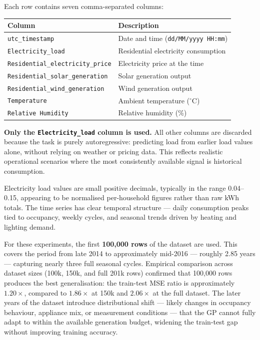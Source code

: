 \documentclass[12pt,a4paper]{article}
\begin{document}
Each row contains seven comma-separated columns:

\begin{center}
\begin{tabular}{ll}
\toprule
\textbf{Column} & \textbf{Description} \\
\midrule
\texttt{utc\_timestamp} & Date and time (\texttt{dd/MM/yyyy HH:mm}) \\
\texttt{Electricity\_load} & Residential electricity consumption \\
\texttt{Residential\_electricity\_price} & Electricity price at the time \\
\texttt{Residential\_solar\_generation} & Solar generation output \\
\texttt{Residential\_wind\_generation} & Wind generation output \\
\texttt{Temperature} & Ambient temperature ($^\circ$C) \\
\texttt{Relative Humidity} & Relative humidity (\%) \\
\bottomrule
\end{tabular}
\end{center}

\textbf{Only the \texttt{Electricity\_load} column is used.} All other columns are discarded because the task is purely autoregressive: predicting load from earlier load values alone, without relying on weather or pricing data. This reflects realistic operational scenarios where the most consistently available signal is historical consumption.

Electricity load values are small positive decimals, typically in the range 0.04--0.15, appearing to be normalised per-household figures rather than raw kWh totals. The time series has clear temporal structure --- daily consumption peaks tied to occupancy, weekly cycles, and seasonal trends driven by heating and lighting demand.

For these experiments, the first \textbf{100,000 rows} of the dataset are used. This covers the period from late 2014 to approximately mid-2016 --- roughly 2.85 years --- capturing nearly three full seasonal cycles. Empirical comparison across dataset sizes (100k, 150k, and full 201k rows) confirmed that 100,000 rows produces the best generalisation: the train-test MSE ratio is approximately $1.20\times$, compared to $1.86\times$ at 150k and $2.06\times$ at the full dataset. The later years of the dataset introduce distributional shift --- likely changes in occupancy behaviour, appliance mix, or measurement conditions --- that the GP cannot fully adapt to within the available generation budget, widening the train-test gap without improving training accuracy.
\end{document}
